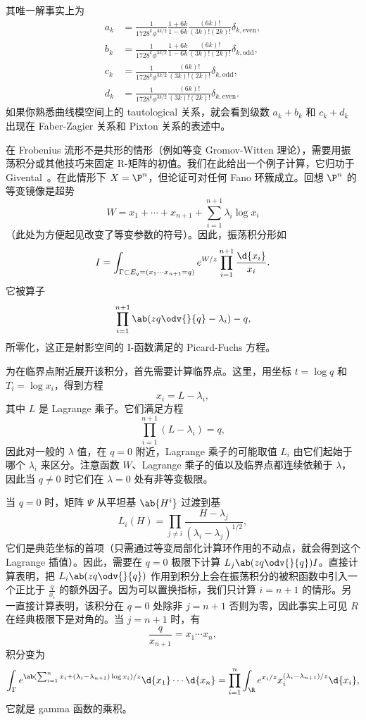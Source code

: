 其唯一解事实上为
\begin{align*}
    a_k &= \frac{1}{1728^k \phi^{3k/2}} \frac{1+6k}{1-6k} \frac{(6k)!}{(3k)!(2k)!} \delta_{k, \text{even}},  \\
    b_k &= \frac{1}{1728^k \phi^{3k/2}} \frac{1+6k}{1-6k}\frac{(6k)!}{(3k)!(2k)!} \delta_{k, \text{odd}},  \\
    c_k &= \frac{1}{1728^k \phi^{3k/2}}\frac{(6k)!}{(3k)!(2k)!} \delta_{k, \text{odd}}, \\
    d_k &= \frac{1}{1728^k \phi^{3k/2}} \frac{(6k)!}{(3k)!(2k)!} \delta_{k, \text{even}}. 
\end{align*}
如果你熟悉曲线模空间上的 tautological 关系，就会看到级数 \(a_k + b_k\) 和 \(c_k + d_k\) 出现在 Faber-Zagier 关系和 Pixton 关系的表述中。

在 Frobenius 流形不是共形的情形（例如等变 Gromov-Witten 理论），需要用振荡积分或其他技巧来固定 R-矩阵的初值。我们在此给出一个例子计算，它归功于 Givental~\cite{Givental2001semisimple}。在此情形下 \(X = \P^n\)，但论证可对任何 Fano 环簇成立。回想 \(\P^n\) 的等变镜像是超势
\[ W = x_1 + \cdots + x_{n+1} + \sum_{i=1}^{n+1} \lambda_i \log x_i \]
（此处为方便起见改变了等变参数的符号）。因此，振荡积分形如
\[ I = \int_{\Gamma \subset E_q = (x_1 \cdots x_{n+1}=q)} e^{W/z} \prod_{i=1}^{n+1} \frac{\d{x_i}}{x_i}. \]
它被算子
\[ \prod_{i=1}^{n+1}\ab(zq \odv{}{q} -\lambda_i) - q, \]
所零化，这正是射影空间的 I-函数满足的 Picard-Fuchs 方程。

为在临界点附近展开该积分，首先需要计算临界点。这里，用坐标 \(t = \log q\) 和 \(T_i = \log x_i\)，得到方程
\[ x_i = L - \lambda_i, \]
其中 \(L\) 是 Lagrange 乘子。它们满足方程
\[ \prod_{i=1}^{n+1} (L - \lambda_i) = q, \]
因此对一般的 \(\lambda\) 值，在 \(q = 0\) 附近，Lagrange 乘子的可能取值 \(L_i\) 由它们起始于哪个 \(\lambda_i\) 来区分。注意函数 \(W\)、Lagrange 乘子的值以及临界点都连续依赖于 \(\lambda\)，因此当 \(q \neq 0\) 时它们在 \(\lambda = 0\) 处有非等变极限。

当 \(q = 0\) 时，矩阵 \(\Psi\) 从平坦基 \(\ab{H^i}\) 过渡到基
\[ L_i(H) = \prod_{j \neq i} \frac{H - \lambda_j}{(\lambda_i - \lambda_j)^{1/2}}, \]
它们是典范坐标的首项（只需通过等变局部化计算环作用的不动点，就会得到这个 Lagrange 插值）。因此，需要在 \(q = 0\) 极限下计算 \(L_j \ab(z q \odv{}{q}) I\)。直接计算表明，把 \(L_i \ab(z q \odv{}{q})\) 作用到积分上会在振荡积分的被积函数中引入一个正比于 \(\frac{q}{x_i}\) 的额外因子。因为可以置换指标，我们只计算 \(i = n+1\) 的情形。另一直接计算表明，该积分在 \(q = 0\) 处除非 \( j = n+1\) 否则为零，因此事实上可见 \(R\) 在经典极限下是对角的。当 \(j = n+1\) 时，有
\[ \frac{q}{x_{n+1}} = x_1 \cdots x_n, \]
积分变为
\[ \int_{\Gamma} e^{\ab( \sum_{i=1}^n x_i + (\lambda_i - \lambda_{n+1})\log x_i ) / z} \d{x_1} \cdots \d{x_n} = \prod_{i=1}^n \int_{\R} e^{x_i/z} x_i^{(\lambda_i - \lambda_{n+1})/z} \d{x_i}, \]
它就是 gamma 函数的乘积。

